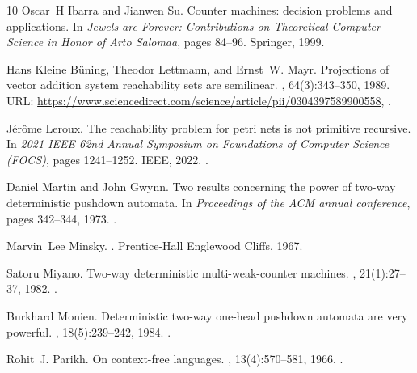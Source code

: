 \documentclass[11pt,a4paper]{amsart}
\theoremstyle{definition}
\begin{document}
\begin{thebibliography}{10}
Oscar~H Ibarra and Jianwen Su.
\newblock Counter machines: decision problems and applications.
\newblock In {\em Jewels are Forever: Contributions on Theoretical Computer
  Science in Honor of Arto Salomaa}, pages 84--96. Springer, 1999.

Hans {Kleine Büning}, Theodor Lettmann, and Ernst~W. Mayr.
\newblock Projections of vector addition system reachability sets are
  semilinear.
, 64(3):343--350, 1989.
\newblock URL:
  \url{https://www.sciencedirect.com/science/article/pii/0304397589900558},
  \href {https://doi.org/https://doi.org/10.1016/0304-3975(89)90055-8}
  {}.

J{\'e}r{\^o}me Leroux.
\newblock The reachability problem for petri nets is not primitive recursive.
\newblock In {\em 2021 IEEE 62nd Annual Symposium on Foundations of Computer
  Science (FOCS)}, pages 1241--1252. IEEE, 2022.
\newblock \href {https://doi.org/10.1109/FOCS52979.2021.00121}
  {}.

Daniel Martin and John Gwynn.
\newblock Two results concerning the power of two-way deterministic pushdown
  automata.
\newblock In {\em Proceedings of the ACM annual conference}, pages 342--344,
  1973.
\newblock \href {https://doi.org/10.1145/800192.805729}
  {}.

Marvin~Lee Minsky.
.
\newblock Prentice-Hall Englewood Cliffs, 1967.

Satoru Miyano.
\newblock Two-way deterministic multi-weak-counter machines.
, 21(1):27--37, 1982.
\newblock \href {https://doi.org/10.1016/0304-3975(82)90086-X}
  {}.

Burkhard Monien.
\newblock Deterministic two-way one-head pushdown automata are very powerful.
, 18(5):239--242, 1984.
\newblock \href {https://doi.org/10.1016/0020-0190(84)90001-2}
  {}.

Rohit~J. Parikh.
\newblock On context-free languages.
, 13(4):570--581, 1966.
\newblock \href {https://doi.org/10.1145/321356.321364}
  {}.


\end{thebibliography}
\end{document}
